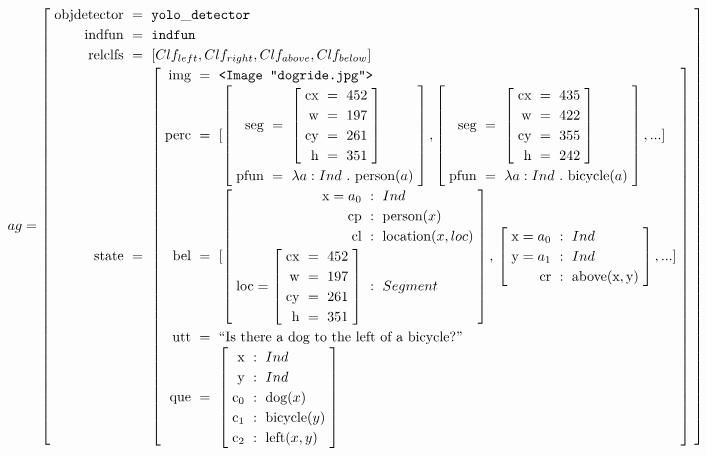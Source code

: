 \begin{landscape}
\begin{equation}\label{eq:ag}
\def\arraystretch{1.2}
ag =
\rec{
    \text{objdetector} &=& \mathtt{yolo\_detector} \\
    \text{indfun} &=& \mathtt{indfun} \\
    \text{relclfs} &=& [Clf_{left}, Clf_{right}, Clf_{above}, Clf_{below}] \\
    \text{state} &=& \rec{
		\text{img} &=& \text{\tt <Image "dogride.jpg">} \\
		\text{perc} &=& [
			\rec{
				\text{seg} &=& \rec{
					\text{cx} &=& 452\\
					\text{w} &=& 197\\
					\text{cy} &=& 261 \\
					\text{h} &=& 351\\
					}\\
				\text{pfun} &=& \lambda a:Ind\ .\ \text{person}(a)
				},
			\rec{
				\text{seg} &=& \rec{
					\text{cx} &=& 435\\
					\text{w} &=& 422\\
					\text{cy} &=& 355 \\
					\text{h} &=& 242\\
					}\\
				\text{pfun} &=& \lambda a:Ind\ .\ \text{bicycle}(a)
				},
			... ] \\
		\text{bel} &=& [
			\rec{
				\text{x} = a_0 &:& Ind\\
				\text{cp} &:& \text{person}(x)\\
				\text{cl} &:& \text{location}(x, loc)\\
				\text{loc} = \rec{
					\text{cx} &=& 452\\
					\text{w} &=& 197\\
					\text{cy} &=& 261 \\
					\text{h} &=& 351\\
					}
					&:& Segment \\
				},
			{}{} \rec{
				\text{x} = a_0 &:& Ind \\
				\text{y} = a_1 &:& Ind \\
				\text{cr} &:& \text{above}(\text{x}, \text{y})
				},
			... ] \\
        \text{utt} &=& \text{``Is there a dog to the left of a bicycle?''} \\
		\text{que} &=& \rec{
			\text{x} &:& Ind\\
			\text{y} &:& Ind\\
			\text{c}_\text{0} &:& \text{dog}(x)\\
			\text{c}_\text{1} &:& \text{bicycle}(y)\\
			\text{c}_\text{2} &:& \text{left}(x, y)\\
			} \\
		} \\
    }
\end{equation}
\end{landscape}



